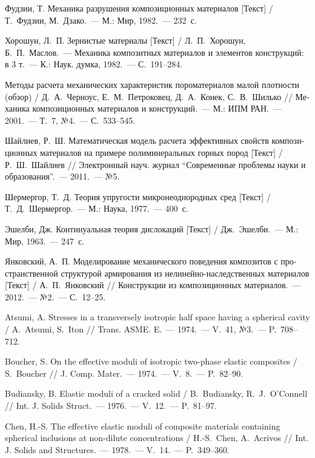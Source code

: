 \begin{russian}
\begin{biblist}{99}
Фудзии, Т. 
Механика разрушения композиционных материалов [Текст] 
/ Т.~Фудзии, М.~Дзако.~--- М.: Мир, 1982.~--- 232~с.

Хорошун, Л.~П. 
Зернистые материалы [Текст] 
/ Л.~П.~Хорошун, Б.~П.~Маслов.~--- Механика композитных материалов и элементов конструкций: в 3 т.~--- К.: Наук. думка, 1982.~--- С.~191--284.

Методы расчета механических характеристик пороматериалов малой плотности (обзор) 
/ Д.~А.~Черноус, Е.~М.~Петроковец, Д.~А.~Конек, С.~В.~Шилько 
// Механика композиционных материалов и конструкций.~--- М.: ИПМ РАН.~--- 2001.~--- Т.~7, №4.~--- С.~533--545.

Шайлиев, Р.~Ш. 
Математическая модель расчета эффективных свойств композиционных материалов на примере полиминеральных горных пород [Текст] 
/ Р.~Ш.~Шайлиев 
// Электронный науч. журнал ``Современные проблемы науки и образования''.~--- 2011.~--- №5.

Шермергор, Т.~Д. 
Теория упругости микронеоднородных сред [Текст] 
/ Т.~Д.~Шермергор.~--- М.: Наука, 1977.~--- 400~с.

Эшелби, Дж. 
Континуальная теория дислокаций [Текст] 
/ Дж.~Эшелби.~--- М.: Мир, 1963.~--- 247~с.

Янковский, А.~П. 
Моделирование механического поведения композитов с пространственной структурой армирования из нелинейно-наследственных материалов [Текст] 
/ А.~П.~Янковский 
// Конструкции из композиционных материалов.~--- 2012.~--- №2.~--- С.~12--25.

Atsumi, A. 
Stresses in a transversely isotropic half space having a spherical cavity 
/ A.~Atsumi, S.~Iton 
// Trans. ASME. E.~--- 1974.~--- V.~41, №3.~--- P.~708--712.

Boucher, S. 
On the effective moduli of isotropic two-phase elastic composites 
/ S.~Boucher 
// J. Comp. Mater.~--- 1974.~--- V.~8.~--- P.~82--90.

Budiansky, B. 
Elastic moduli of a cracked solid 
/ B.~Budiansky, R.~J.~O'Connell 
// Int. J. Solids Struct.~--- 1976.~--- V.~12.~--- P.~81--97.

Chen, H.-S. 
The effective elastic moduli of composite materials containing spherical inclusions at non-dilute concentrations 
/ H.-S.~Chen, A.~Acrivos 
// Int. J. Solids and Structures.~--- 1978.~--- V.~14.~--- P.~349--360.


\end{biblist}
\end{russian}
